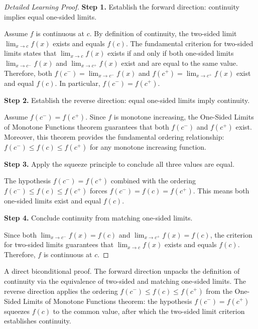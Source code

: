 \begin{proof}[Detailed Learning Proof]
\LRAProofBodyStart

\textbf{Step 1.} Establish the forward direction: continuity implies equal one-sided limits.

Assume $f$ is continuous at $c$. By definition of continuity, the two-sided limit $\lim_{x \to c} f(x)$ exists and equals $f(c)$. The fundamental criterion for two-sided limits states that $\lim_{x \to c} f(x)$ exists if and only if both one-sided limits $\lim_{x \to c^{-}} f(x)$ and $\lim_{x \to c^{+}} f(x)$ exist and are equal to the same value. Therefore, both $f(c^{-}) = \lim_{x \to c^{-}} f(x)$ and $f(c^{+}) = \lim_{x \to c^{+}} f(x)$ exist and equal $f(c)$. In particular, $f(c^{-}) = f(c^{+})$.

\textbf{Step 2.} Establish the reverse direction: equal one-sided limits imply continuity.

Assume $f(c^{-}) = f(c^{+})$. Since $f$ is monotone increasing, the One-Sided Limits of Monotone Functions theorem guarantees that both $f(c^{-})$ and $f(c^{+})$ exist. Moreover, this theorem provides the fundamental ordering relationship: $f(c^{-}) \leq f(c) \leq f(c^{+})$ for any monotone increasing function.

\textbf{Step 3.} Apply the squeeze principle to conclude all three values are equal.

The hypothesis $f(c^{-}) = f(c^{+})$ combined with the ordering $f(c^{-}) \leq f(c) \leq f(c^{+})$ forces $f(c^{-}) = f(c) = f(c^{+})$. This means both one-sided limits exist and equal $f(c)$.

\textbf{Step 4.} Conclude continuity from matching one-sided limits.

Since both $\lim_{x \to c^{-}} f(x) = f(c)$ and $\lim_{x \to c^{+}} f(x) = f(c)$, the criterion for two-sided limits guarantees that $\lim_{x \to c} f(x)$ exists and equals $f(c)$. Therefore, $f$ is continuous at $c$.
\end{proof}

\begin{remark*}
A direct biconditional proof. The forward direction unpacks the definition of continuity via the equivalence of two-sided and matching one-sided limits. The reverse direction applies the ordering $f(c^{-}) \leq f(c) \leq f(c^{+})$ from the One-Sided Limits of Monotone Functions theorem: the hypothesis $f(c^{-}) = f(c^{+})$ squeezes $f(c)$ to the common value, after which the two-sided limit criterion establishes continuity.
\end{remark*}

